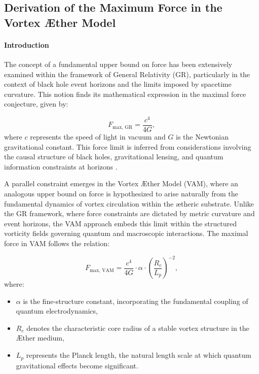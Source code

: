 
\subsection{Derivation of the Maximum Force in the Vortex Æther Model}

\paragraph*{Introduction}
The concept of a fundamental upper bound on force has been extensively examined within the framework of General Relativity (GR), particularly in the context of black hole event horizons and the limits imposed by spacetime curvature. This notion finds its mathematical expression in the maximal force conjecture, given by:


\begin{equation*}
F_\text{max, GR} = \frac{c^4}{4G},
\end{equation*}
where $c$ represents the speed of light in vacuum and $G$ is the Newtonian gravitational constant. This force limit is inferred from considerations involving the causal structure of black holes, gravitational lensing, and quantum information constraints at horizons \cite{Schiller2006}.


A parallel constraint emerges in the Vortex Æther Model (VAM), where an analogous upper bound on force is hypothesized to arise naturally from the fundamental dynamics of vortex circulation within the ætheric substrate. Unlike the GR framework, where force constraints are dictated by metric curvature and event horizons, the VAM approach embeds this limit within the structured vorticity fields governing quantum and macroscopic interactions. The maximal force in VAM follows the relation:


\begin{equation*}
F_\text{max, VAM} = \frac{c^4}{4G} \cdot \alpha \cdot \left(\frac{R_c}{L_p}\right)^{-2},
\end{equation*}
where:
\begin{itemize}
\item $\alpha$ is the fine-structure constant, incorporating the fundamental coupling of quantum electrodynamics,
\item $R_c$ denotes the characteristic core radius of a stable vortex structure in the Æther medium,
\item $L_p$ represents the Planck length, the natural length scale at which quantum gravitational effects become significant.
\end{itemize}


